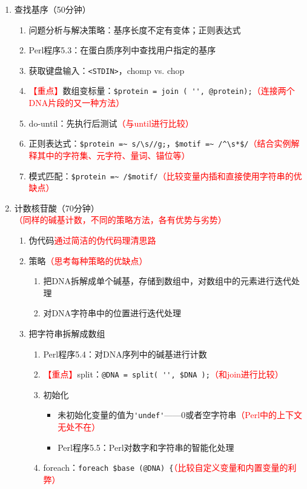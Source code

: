 \documentclass{TIJMUjiaoanLL}
\begin{document}
\begin{enumerate}
  \item 查找基序（50分钟）
    \begin{enumerate}
      \item 问题分析与解决策略：基序长度不定有变体；正则表达式
      \item Perl程序5.3：在蛋白质序列中查找用户指定的基序
      \item 获取键盘输入：\verb|<STDIN>|，chomp vs. chop
      \item \textcolor{red}{【重点】}数组变标量：\verb|$protein = join ( '', @protein);|\textcolor{red}{（连接两个DNA片段的又一种方法）}
      \item do-until：先执行后测试\textcolor{red}{（与until进行比较）}
      \item 正则表达式：\verb|$protein =~ s/\s//g;|，\verb|$motif =~ /^\s*$/|\textcolor{red}{（结合实例解释其中的字符集、元字符、量词、锚位等）}
      \item 模式匹配：\verb|$protein =~ /$motif/|\textcolor{red}{（比较变量内插和直接使用字符串的优缺点）}
    \end{enumerate}
  \item 计数核苷酸（70分钟）\textcolor{red}{（同样的碱基计数，不同的策略方法，各有优势与劣势）}
    \begin{enumerate}
      \item 伪代码\textcolor{red}{通过简洁的伪代码理清思路}
      \item 策略\textcolor{red}{（思考每种策略的优缺点）}
	\begin{enumerate}
	  \item 把DNA拆解成单个碱基，存储到数组中，对数组中的元素进行迭代处理
	  \item 对DNA字符串中的位置进行迭代处理
	\end{enumerate}
      \item 把字符串拆解成数组
	\begin{enumerate}
	  \item Perl程序5.4：对DNA序列中的碱基进行计数
	  \item \textcolor{red}{【重点】}split：\verb|@DNA = split( '', $DNA );|\textcolor{red}{（和join进行比较）}
	  \item 初始化
	    \begin{itemize}
	      \item 未初始化变量的值为\verb|'undef'|——0或者空字符串\textcolor{red}{（Perl中的上下文无处不在）}
	      \item Perl程序5.5：Perl对数字和字符串的智能化处理
	    \end{itemize}
	  \item foreach：\verb|foreach $base (@DNA) {|\textcolor{red}{（比较自定义变量和内置变量的利弊）}

\end{enumerate}
\end{enumerate}
\end{enumerate}
\end{document}
